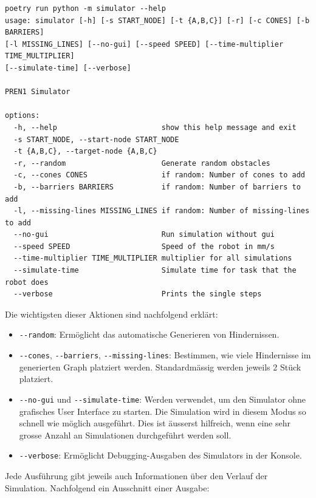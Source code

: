 \begin{footnotesize}
\begin{verbatim}
poetry run python -m simulator --help
usage: simulator [-h] [-s START_NODE] [-t {A,B,C}] [-r] [-c CONES] [-b BARRIERS] 
[-l MISSING_LINES] [--no-gui] [--speed SPEED] [--time-multiplier TIME_MULTIPLIER] 
[--simulate-time] [--verbose]

PREN1 Simulator

options:
  -h, --help                        show this help message and exit
  -s START_NODE, --start-node START_NODE
  -t {A,B,C}, --target-node {A,B,C}
  -r, --random                      Generate random obstacles
  -c, --cones CONES                 if random: Number of cones to add
  -b, --barriers BARRIERS           if random: Number of barriers to add
  -l, --missing-lines MISSING_LINES if random: Number of missing-lines to add
  --no-gui                          Run simulation without gui
  --speed SPEED                     Speed of the robot in mm/s
  --time-multiplier TIME_MULTIPLIER multiplier for all simulations
  --simulate-time                   Simulate time for task that the robot does
  --verbose                         Prints the single steps
\end{verbatim}
\end{footnotesize}

Die wichtigsten dieser Aktionen sind nachfolgend erklärt:

\begin{itemize}
    \item \verb|--random|: Ermöglicht das automatische Generieren von Hindernissen.
    \item \verb|--cones|, \verb|--barriers|, \verb|--missing-lines|: Bestimmen, wie viele Hindernisse im generierten Graph platziert werden. Standardmässig werden jeweils 2 Stück platziert.
    \item \verb|--no-gui| und \verb|--simulate-time|: Werden verwendet, um den Simulator ohne grafisches User Interface zu starten. Die Simulation wird in diesem Modus so schnell wie möglich ausgeführt. Dies ist äusserst hilfreich, wenn eine sehr grosse Anzahl an Simulationen durchgeführt werden soll.
    \item \verb|--verbose|: Ermöglicht Debugging-Ausgaben des Simulators in der Konsole.
\end{itemize}

Jede Ausführung gibt jeweils auch Informationen über den Verlauf der Simulation. Nachfolgend ein Ausschnitt einer Ausgabe:


